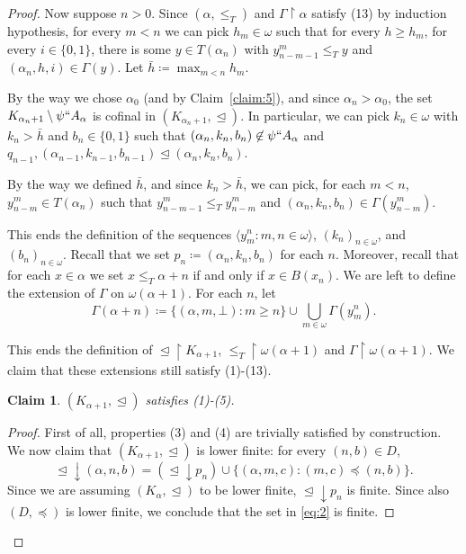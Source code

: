 \documentclass[]{amsart}
\newtheorem{claim}{Claim}[theorem]
\theoremstyle{definition}
\theoremstyle{remark}
\begin{document}
\begin{proof}
Now suppose $n > 0$. Since  $(\alpha, \le_T)$ and $\Gamma \upharpoonright \alpha$ satisfy (13) by induction hypothesis, for every $m < n$ we can pick $h_m \in \omega$ such that for every $h \ge h_m$, for every $i \in \{0,1\}$, there is some $y \in T(\alpha_n)$ with $y_{n-m-1}^m \le_T y$ and $(\alpha_{n}, h, i) \in \Gamma (y)$. Let $\bar{h} \coloneqq \max_{m < n} h_m$. 

By the way we chose $\alpha_0$ (and by Claim~\ref{claim:5}), and since $\alpha_{n} > \alpha_0$, the set $K_{\alpha_{n}+1} \setminus \psi`` A_\alpha$ is cofinal in $(K_{\alpha_{n}+1}, \trianglelefteq)$. In particular,  we can pick $k_{n} \in \omega$ with $k_{n} > \bar{h}$ and $b_{n} \in \{0, 1\}$ such that $(\alpha_{n}, k_{n}, b_{n}) \not\in \psi`` A_\alpha$ and $q_{n-1}, (\alpha_{n-1}, k_{n-1}, b_{n-1}) \trianglelefteq (\alpha_{n}, k_{n}, b_{n})$.

By the way we defined $\bar{h}$, and since $k_{n} > \bar{h}$, we can pick, for each $m < n$, $y_{n-m}^m \in T(\alpha_n)$ such that $y_{n-m-1}^m \le_T  y_{n-m}^m$ and $(\alpha_{n}, k_{n}, b_{n}) \in \Gamma(y_{n-m}^m)$. 

This ends the definition of the sequences $\langle y^n_m : m,n\in\omega\rangle$, $(k_n)_{n\in\omega}$, and $(b_n)_{n\in\omega}$. Recall that we set $p_n \coloneqq (\alpha_n, k_n, b_n)$ for each $n$. Moreover, recall that for each $x \in \alpha$ we set $x \le_T \alpha + n$ if and only if $x \in B(x_n)$. We are left to define the extension of $\Gamma$ on $\omega(\alpha+1)$. For each $n$, let
\begin{equation}\label{eq:main4:defgammalimit}
\Gamma (\alpha+ n) \coloneqq \{(\alpha, m, \bot) : m \ge n\} \cup \bigcup_{m\in\omega} \Gamma (y_m^n). 
\end{equation}


This ends the definition of ${\trianglelefteq} \upharpoonright K_{\alpha+1}$, ${\le_T} \upharpoonright \omega(\alpha+1)$ and $\Gamma \upharpoonright \omega(\alpha+1)$.  We claim that these extensions still satisfy (1)-(13).

\begin{claim}
$(K_{\alpha+1}, \trianglelefteq)$ satisfies {\upshape (1)-(5)}.
\end{claim}
\begin{proof}
 First of all, properties (3) and (4) are trivially satisfied by construction. We now claim that $(K_{\alpha+1}, \trianglelefteq)$ is lower finite: for every $(n, b) \in D$, 
\begin{equation}\label{eq:2}
{\trianglelefteq} \downarrow (\alpha, n, b) = ({\trianglelefteq} \downarrow p_n) \cup \{(\alpha, m, c) : (m, c) \preceq (n, b)\}.
\end{equation}
Since we are assuming $(K_\alpha, \trianglelefteq)$ to be lower finite, ${\trianglelefteq} \downarrow p_n$ is finite. Since also $(D, \preceq)$ is lower finite, we conclude that the set in \eqref{eq:2} is finite. 


\end{proof}
\end{proof}
\end{document}
